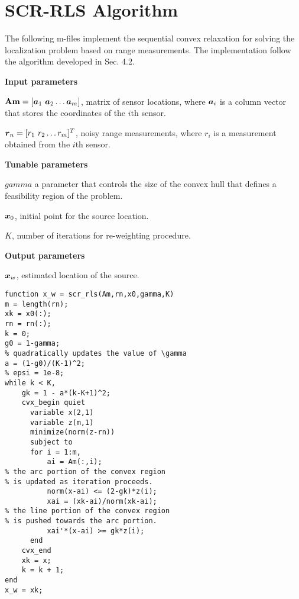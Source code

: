 \section{SCR-RLS Algorithm}

The following m-files implement the sequential convex relaxation for solving the localization problem based on range measurements. The implementation follow the algorithm developed in Sec. 4.2.

\phantom{m}

\noindent
\textbf{Input parameters}

\noindent
$\mbox{\textbf{Am}} = [\mbox{\boldmath$a$}_1 \ \mbox{\boldmath$a$}_2 \ldots \mbox{\boldmath$a$}_m]$, matrix of sensor locations, where $\mbox{\boldmath$a$}_i$ is a column vector that stores the coordinates of the $i$th sensor.

\noindent
$\mbox{\boldmath$r$}_n = [r_1 \ r_2 \ldots r_m]^T$, noisy range measurements, where $r_i$ is a measurement obtained from the $i$th sensor.

\noindent
\textbf{Tunable parameters}

\noindent
$gamma$ a parameter that controls the size of the convex hull that defines a feasibility region of the problem.

\noindent
$\mbox{\boldmath$x$}_0$, initial point for the source location.

\noindent
$K$, number of iterations for re-weighting procedure.

\noindent
\textbf{Output parameters}

\noindent
$\mbox{\boldmath$x$}_w$, estimated location of the source.

\phantom{m}

\begin{lstlisting}
function x_w = scr_rls(Am,rn,x0,gamma,K)
m = length(rn);
xk = x0(:);
rn = rn(:);
k = 0;
g0 = 1-gamma;
% quadratically updates the value of \gamma
a = (1-g0)/(K-1)^2;        
% epsi = 1e-8;
while k < K,
    gk = 1 - a*(k-K+1)^2;   
    cvx_begin quiet
      variable x(2,1)
      variable z(m,1)
      minimize(norm(z-rn))
      subject to
      for i = 1:m,
          ai = Am(:,i);
% the arc portion of the convex region 
% is updated as iteration proceeds.
          norm(x-ai) <= (2-gk)*z(i);  
          xai = (xk-ai)/norm(xk-ai);
% the line portion of the convex region 
% is pushed towards the arc portion.
          xai'*(x-ai) >= gk*z(i);     
      end
    cvx_end
    xk = x;
    k = k + 1;
end
x_w = xk;
\end{lstlisting}